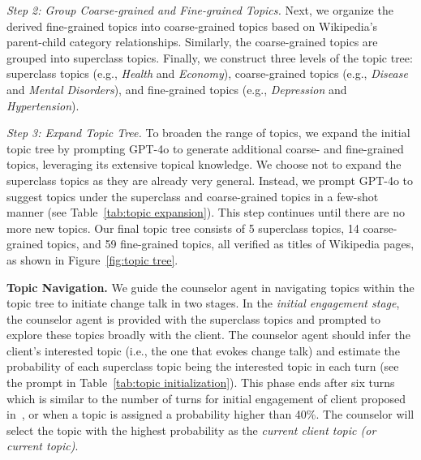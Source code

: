     \noindent
    \textit{Step 2: Group Coarse-grained and Fine-grained Topics.} Next, we organize the derived fine-grained topics into coarse-grained topics based on Wikipedia's parent-child category relationships. Similarly, the coarse-grained topics are grouped into superclass topics.
    Finally, we construct three levels of the topic tree: superclass topics (e.g., {\em Health} and {\em Economy}), coarse-grained topics (e.g., {\em Disease} and {\em Mental Disorders}), and fine-grained topics (e.g., {\em Depression} and {\em Hypertension}). 
    
    \noindent 
    \textit{Step 3: Expand Topic Tree.} To broaden the range of topics, we expand the initial topic tree by prompting GPT-4o to generate additional coarse- and fine-grained topics, leveraging its extensive topical knowledge. We choose not to expand the superclass topics as they are already very general. Instead, we prompt GPT-4o to suggest topics under the superclass and coarse-grained topics in a few-shot manner (see Table~\ref{tab:topic expansion}). This step continues until there are no more new topics. Our final topic tree consists of 5 superclass topics, 14 coarse-grained topics, and 59 fine-grained topics, all verified as titles of Wikipedia pages, as shown in Figure~\ref{fig:topic tree}.

\noindent
\textbf{Topic Navigation.} We guide the counselor agent in navigating topics within the topic tree to initiate change talk in two stages. 
In the {\em initial engagement stage}, the counselor agent is provided with the superclass topics and prompted to %
explore these topics broadly with the client. The counselor agent should infer the client's interested topic (i.e., the one that evokes change talk) and estimate the probability of each superclass topic being the interested topic in each turn (see the prompt in Table~\ref{tab:topic initialization}). This phase ends after six turns which is similar to the number of turns for initial engagement of client proposed in~\citet{park2019designing}, or when a topic is assigned a probability higher than 40\%. The counselor will select the topic with the highest probability as the \textit{current client topic (or current topic)}.

